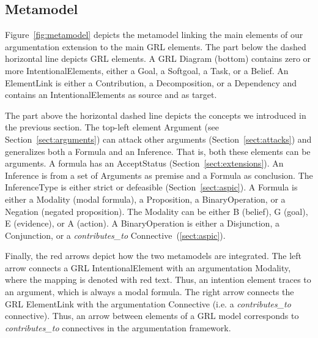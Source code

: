\subsection{Metamodel}


Figure~\ref{fig:metamodel} depicts the metamodel linking the main elements of our argumentation extension to the main GRL elements. The part below the dashed horizontal line depicts GRL elements. A \textsf{GRL Diagram} (bottom) contains zero or more \textsf{IntentionalElements}, either a \textsf{Goal}, a \textsf{Softgoal}, a \textsf{Task}, or a \textsf{Belief}. An \textsf{ElementLink} is either a \textsf{Contribution}, a \textsf{Decomposition}, or a \textsf{Dependency} and contains an \textsf{IntentionalElements} as source and as target.

The part above the horizontal dashed line depicts the concepts we introduced in the previous section. The top-left element \textsf{Argument} (see Section~\ref{sect:arguments}) can attack other arguments (Section~\ref{sect:attacks}) and generalizes both a \textsf{Formula} and an \textsf{Inference}. That is, both these elements can be arguments. A formula has an \textsf{AcceptStatus} (Section~\ref{sect:extensions}). An \textsf{Inference} is from a set of \textsf{Arguments} as premise and a \textsf{Formula} as conclusion. The \textsf{InferenceType} is either strict or defeasible (Section~\ref{sect:aspic}). A \textsf{Formula} is either a \textsf{Modality} (modal formula), a \textsf{Proposition}, a \textsf{BinaryOperation}, or a \textsf{Negation} (negated proposition). The \textsf{Modality} can be either B (belief), G (goal), E (evidence), or A (action). A \textsf{BinaryOperation} is either a \textsf{Disjunction}, a \textsf{Conjunction}, or a \emph{contributes\_to} \textsf{Connective}~(\ref{sect:aspic}).

Finally, the red arrows depict how the two metamodels are integrated. The left arrow connects a GRL \textsf{IntentionalElement} with an argumentation \textsf{Modality}, where the mapping is denoted with red text. Thus, an intention element traces to an argument, which is always a modal formula. The right arrow connects the GRL \textsf{ElementLink} with the argumentation \textsf{Connective} (i.e. a \emph{contributes\_to} connective). Thus, an arrow between elements of a GRL model corresponds to \emph{contributes\_to} connectives in the argumentation framework.

